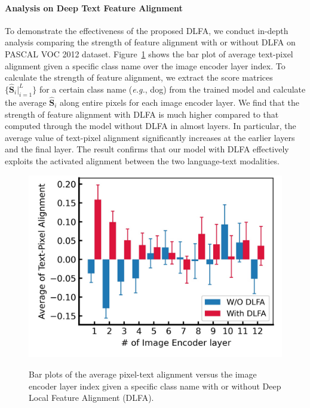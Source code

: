 \documentclass[nohyperref]{article}
\newcommand{\bs}{\boldsymbol}
\theoremstyle{plain}
\theoremstyle{definition}
\theoremstyle{remark}
\begin{document}
\vspace{-0.2em}
\paragraph{Analysis on Deep Text Feature Alignment}
To demonstrate the effectiveness of the proposed DLFA, we conduct in-depth analysis comparing the strength of feature alignment with or without DLFA on PASCAL VOC 2012 dataset.
Figure~\ref{DLFA} shows the bar plot of average text-pixel alignment given a specific class name over the image encoder layer index.
To calculate the strength of feature alignment, we extract the score matrices $\{\bs{\hat S}_i|_{i=1}^{L}\}$ for a certain class name (\textit{e.g.}, dog) from the trained model and calculate the average $\bs{\hat S}_i$ along entire pixels for each image encoder layer.
We find that the strength of feature alignment with DLFA is much higher compared to that computed through the model without DLFA in almost layers. 
In particular, the average value of text-pixel alignment significantly increases at the earlier layers and the final layer. The result confirms that our model with DLFA effectively exploits the activated alignment between the two language-text modalities.


\begin{figure}[t]
\vskip 0.1in
\begin{center}
\includegraphics[width=0.8\linewidth]{fig/DLFA_2.jpg}
 \vspace{-0.35cm}
\caption{Bar plots of the average pixel-text alignment versus the image encoder layer index given a specific class name with or without Deep Local Feature Alignment (DLFA).}
\label{fig_dlfa}
\label{DLFA}
\end{center}
\vskip -0.1in
\end{figure}
\end{document}
